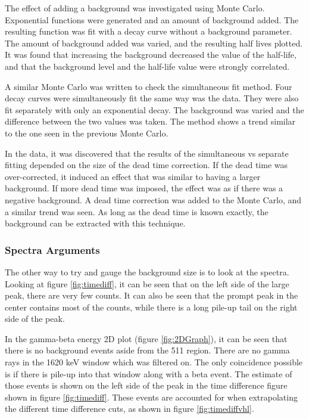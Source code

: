 \documentclass[MaxHughesThesis.tex]{subfiles}
\begin{document}
The effect of adding a background was investigated using Monte Carlo.
Exponential functions were generated and an amount of background added.
The resulting function was fit with a decay curve without a background parameter.
The amount of background added was varied, and the resulting half lives plotted.
It was found that increasing the background decreased the value of the half-life, and that the background level and the half-life value were strongly correlated.

A similar Monte Carlo was written to check the simultaneous fit method.
Four decay curves were simultaneously fit the same way was the data.
They were also fit separately with only an exponential decay.
The background was varied and the difference between the two values was taken.
The method shows a trend similar to the one seen in the previous Monte Carlo.

In the data, it was discovered that the results of the simultaneous vs separate fitting depended on the size of the dead time correction.
If the dead time was over-corrected, it induced an effect that was similar to having a larger background.
If more dead time was imposed, the effect was as if there was a negative background.
A dead time correction was added to the Monte Carlo, and a similar trend was seen.
As long as the dead time is known exactly, the background can be extracted with this technique. 

\subsubsection{Spectra Arguments}
The other way to try and gauge the background size is to look at the spectra.
Looking at figure \ref{fig:timediff}, it can be seen that on the left side of the large peak, there are very few counts.
It can also be seen that the prompt peak in the center contains most of the counts, while there is a long pile-up tail on the right side of the peak.

In the gamma-beta energy 2D plot (figure \ref{fig:2DGraph}), it can be seen that there is no background events aside from the 511 region.
There are no gamma rays in the 1620 keV window which was filtered on.
The only coincidence possible is if there is pile-up into that window along with a beta event.
The estimate of those events is shown on the left side of the peak in the time difference figure shown in figure \ref{fig:timediff}.  
These events are accounted for when extrapolating the different time difference cuts, as shown in figure \ref{fig:timediffvhl}.
\end{document}
